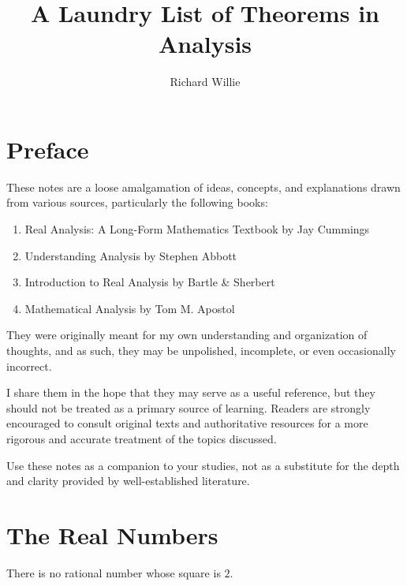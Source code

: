 \documentclass[11pt,twoside=off,numbers=noenddot]{scrbook}
\title{A Laundry List of Theorems in Analysis}
\author{Richard Willie}
\begin{document}
\maketitle

\chapter*{Preface}
These notes are a loose amalgamation of ideas, concepts, and explanations drawn from various sources, particularly the following books:
\begin{enumerate}
    \item Real Analysis: A Long-Form Mathematics Textbook by Jay Cummings \cite{cummings2019real}
    \item Understanding Analysis by Stephen Abbott \cite{abbott2015understanding}
    \item Introduction to Real Analysis by Bartle \& Sherbert \cite{bartle2011introduction}
    \item Mathematical Analysis by Tom M. Apostol \cite{apostol1974mathematical}
\end{enumerate}
They were originally meant for my own understanding and organization of thoughts, and as such, they may be unpolished, incomplete, or even occasionally incorrect.

I share them in the hope that they may serve as a useful reference, but they should not be treated as a primary source of learning. Readers are strongly encouraged to consult original texts and authoritative resources for a more rigorous and accurate treatment of the topics discussed.

Use these notes as a companion to your studies, not as a substitute for the depth and clarity provided by well-established literature.

\tableofcontents

\chapter{The Real Numbers}
\begin{theorem}
    There is no rational number whose square is $2$.
\end{theorem}
\end{document}

